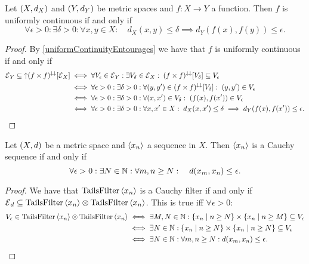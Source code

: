 \begin{corollary}
Let $\left( X, d_X \right)$ and $\left( Y, d_Y \right)$ be metric spaces and $f:X\to Y$ a function. Then $f$ is uniformly continuous \textup{if and only if}
\[ \forall \epsilon >0: \exists \delta >0: \forall x,y\in X: \quad d_X(x,y) \leq \delta \implies d_Y(f(x), f(y)) \leq \epsilon. \]
\end{corollary}
\begin{proof}
By \ref{uniformContinuityEntourages} we have that $f$ is uniformly continuous \textup{if and only if}
\begin{align*}
\operatorname{\mathcal{E}}_Y \subseteq \operatorname{\uparrow}(f\times f)^{\downarrow\downarrow}[\operatorname{\mathcal{E}}_X] &\iff \forall V_\epsilon \in \operatorname{\mathcal{E}}_Y: \exists V_\delta \in \operatorname{\mathcal{E}}_X: \; (f\times f)^{\downarrow\downarrow}[V_\delta] \subseteq V_\epsilon \\
&\iff \forall \epsilon>0: \exists \delta>0: \forall (y,y')\in (f\times f)^{\downarrow\downarrow}[V_\delta]: \; (y,y')\in V_\epsilon \\
&\iff \forall \epsilon>0: \exists \delta>0: \forall (x,x')\in V_\delta:\; (f(x),f(x'))\in V_\epsilon \\
&\iff \forall \epsilon>0: \exists \delta>0: \forall x,x'\in X: \; d_X(x,x')\leq \delta \implies d_Y(f(x),f(x'))\leq \epsilon.
\end{align*}
\end{proof}

\begin{lemma}
Let $\left( X,d \right)$ be a metric space and $\left\langle x_n \right\rangle$ a sequence in $X$. Then $\left\langle x_n \right\rangle$ is a Cauchy sequence \textup{if and only if}
\[ \forall \epsilon >0: \exists N\in\mathbb{N}: \forall m,n \geq N: \quad d(x_m, x_n)\leq \epsilon. \]
\end{lemma}
\begin{proof}
We have that $\operatorname{TailsFilter}\left\langle x_n \right\rangle$ is a Cauchy filter \textup{if and only if} $\operatorname{\mathcal{E}}_d \subseteq \operatorname{TailsFilter}\left\langle x_n \right\rangle\otimes \operatorname{TailsFilter}\left\langle x_n \right\rangle$. This is true iff $\forall \epsilon>0$:
\begin{align*}
V_\epsilon \in \operatorname{TailsFilter}\left\langle x_n \right\rangle\otimes \operatorname{TailsFilter}\left\langle x_n \right\rangle &\iff \exists M,N\in\mathbb{N}: \left\{ x_n \;\middle|\; n\geq N \right\}\times\left\{ x_n \;\middle|\; n\geq M \right\} \subseteq V_\epsilon \\
&\iff \exists N\in\mathbb{N}: \left\{ x_n \;\middle|\; n\geq N \right\}\times\left\{ x_n \;\middle|\; n\geq N \right\} \subseteq V_\epsilon \\
&\iff \exists N\in\mathbb{N}: \forall m,n \geq N: d(x_m, x_n)\leq \epsilon.
\end{align*}
\end{proof}

